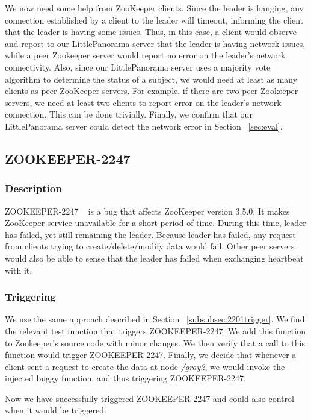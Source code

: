 We now need some help from ZooKeeper clients. Since the leader is hanging, any connection established by a client to the leader will timeout, informing the client that the leader is having some issues. Thus, in this case, a client would observe and report to our LittlePanorama server that the leader is having network issues, while a peer Zookeeper server would report no error on the leader's network connectivity. Also, since our LittlePanorama server uses a majority vote algorithm to determine the status of a subject, we would need at least as many clients as peer ZooKeeper servers. For example, if there are two peer Zookeeper servers, we need at least two clients to report error on the leader's network connection. This can be done trivially. Finally, we confirm that our LittlePanorama server could detect the network error in Section ~\ref{sec:eval}.

\subsection{ZOOKEEPER-2247}

\subsubsection{Description}
ZOOKEEPER-2247 ~\cite{ZOOKEEPER2247:online} is a bug that affects ZooKeeper version 3.5.0. It makes ZooKeeper service unavailable for a short period of time. During this time, leader has failed, yet still remaining the leader. Because leader has failed, any request from clients trying to create/delete/modify data would fail. Other peer servers would also be able to sense that the leader has failed when exchanging heartbeat with it.

\subsubsection{Triggering}
We use the same approach described in Section ~\ref{subsubsec:2201trigger}.
We find the relevant test function that triggers ZOOKEEPER-2247. We add this function to Zookeeper's source code with minor changes. We then verify that a call to this function would trigger ZOOKEEPER-2247. Finally, we decide that whenever a client sent a request to create the data at node \textit{/gray2}, we would invoke the injected buggy function, and thus triggering ZOOKEEPER-2247. 

Now we have successfully triggered ZOOKEEPER-2247 and could also control when it would be triggered. 

